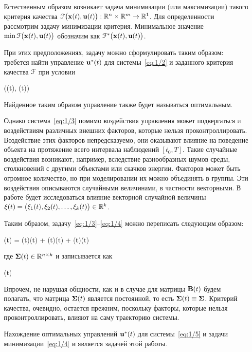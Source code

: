 Естественным образом возникает задача минимизации (или максимизации) такого критерия качества $\mathcal{F}\bigl(\mathbf{x}(t), \mathbf{u}(t)\bigr): \mathbb{R}^{n} \times \mathbb{R}^{m} \to \mathbb{R}^{1}$. Для определенности рассмотрим задачу минимизации критерия. Минимальное значение $\min\mathcal{F}\bigl(\mathbf{x}(t), \mathbf{u}(t)\bigr)$ обозначим как $\mathcal{F}^{*}\bigl(\mathbf{x}(t), \mathbf{u}(t)\bigr)$.

При этих предположениях, задачу можно сформулировать таким образом: требется найти управление $\mathbf{u}^{*}(t)$ для системы~\ref{eq:1/2} и заданного критерия качества $\mathcal{F}$ при условии

	\funcF\bigl((t), (t)\bigr) \to \min {}
\eeq

Найденное таким образом управление также будет называться оптимальным.

\br

Однако система~\ref{eq:1/3} помимо воздействия управления может подвергаться и воздействиям различных внешних факторов, которые нельзя проконтроллировать. Воздействие этих факторов непредсказуемо, они оказывают влияние на поведение объекта на протяжение всего интервала наблюдений $[t_0, T]$. Такие случайные воздействия возникают, например, вследствие разнообразных шумов среды, столкновений с другими объектами или скачков энергии. Факторов может быть огромное количество, но при моделировании их можно объединять в группы. Эти воздействия описываются случайными величинами, в частности векторными. В работе будет исследоваться влияние векторной случайной величины $\mathbf{\xi}(t) = \bigl( \xi_1(t), \xi_2(t), \ldots, \xi_k(t) \bigr) \in \mathbb{R}^{k}$.

Таким образом, задачу~\ref{eq:1/3}--\ref{eq:1/4} можно переписать следующим образом:

	(t) = (t)(t) + (t)(t) + \m{\Sigma}(t)\m{\xi}(t) \text{,}
\eeq

где $\mathbf{\Sigma}(t) \in \mathbb{R}^{{n} \times {k}}$ и записывается как

\beqn
	\m{\Sigma}(t) \eqdef {} 
\eeqn

Впрочем, не нарушая общности, как и в случае для матрицы $\mathbf{B}(t)$ будем полагать, что матрица $\mathbf{\Sigma}(t)$ является постоянной, то есть $\mathbf{\Sigma}(t) \equiv \mathbf{\Sigma}$. Критерий качества, очевидно, остается прежним, поскольку факторы, которые нельзя проконтроллировать, влияют на саму траекторию системы.

Нахождение оптимальных управлений $\mathbf{u}^{*}(t)$ для системы~\ref{eq:1/5} и задачи минимизации~\ref{eq:1/4} и является задачей этой работы.